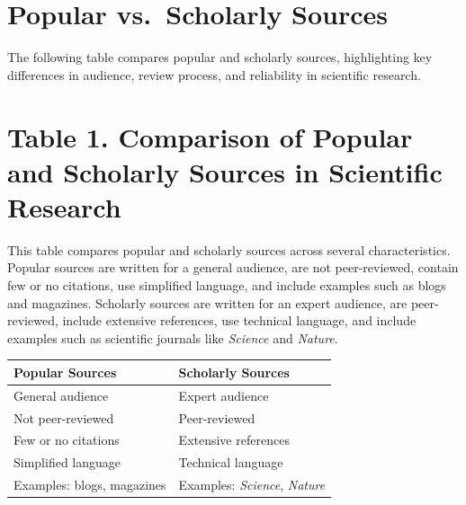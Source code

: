 \documentclass[
  letterpaper,
  DIV=11,
  numbers=noendperiod]{scrreprt}
\newcounter{none} %
\begin{document}
\section*{\texorpdfstring{\textbf{Popular vs.~Scholarly
Sources}}{Popular vs.~Scholarly Sources}}\label{popular-vs.-scholarly-sources}


The following table compares popular and scholarly sources, highlighting
key differences in audience, review process, and reliability in
scientific research.

\section*{\texorpdfstring{\textbf{Table 1. Comparison of Popular and
Scholarly Sources in Scientific
Research}}{Table 1. Comparison of Popular and Scholarly Sources in Scientific Research}}\label{table-1.-comparison-of-popular-and-scholarly-sources-in-scientific-research}


This table compares popular and scholarly sources across several
characteristics. Popular sources are written for a general audience, are
not peer-reviewed, contain few or no citations, use simplified language,
and include examples such as blogs and magazines. Scholarly sources are
written for an expert audience, are peer-reviewed, include extensive
references, use technical language, and include examples such as
scientific journals like \emph{Science} and \emph{Nature}.

{\def\LTcaptype{none} %
\begin{longtable}[]{@{}ll@{}}
\toprule\noalign{}
\textbf{Popular Sources} & \textbf{Scholarly Sources} \\
\midrule\noalign{}
\endhead
\bottomrule\noalign{}
\endlastfoot
General audience & Expert audience \\
Not peer-reviewed & Peer-reviewed \\
Few or no citations & Extensive references \\
Simplified language & Technical language \\
Examples: blogs, magazines & Examples: \emph{Science}, \emph{Nature} \\
\end{longtable}
}
\end{document}
